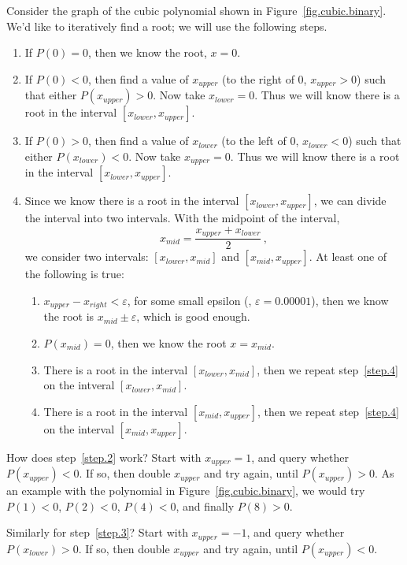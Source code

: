 Consider the graph of the cubic polynomial shown in Figure~\ref{fig.cubic.binary}.  We'd like to
iteratively find a root; we will use the following steps.

\begin{enumerate}
\item If $P(0)=0$, then we know the root, $x=0$.
\item \label{step.2} If $P(0)< 0$, then find a value of $x_{upper}$ (to the right of 0, $x_{upper}>0$) such that either $P(x_{upper})>0$.
  Now take $x_{lower}=0$.
  Thus we
  will know there is a root in the interval $[x_{lower}, x_{upper}]$.
\item \label{step.3} If $P(0)> 0$, then find a value of $x_{lower}$ (to the left of 0, $x_{lower}<0$) such that either $P(x_{lower})<0$. 
  Now take $x_{upper}=0$.
 Thus we
  will know there is a root in the interval $[x_{lower}, x_{upper}]$.
\item \label{step.4} Since we know there is a root in the interval
  $[x_{lower}, x_{upper}]$, we can divide the interval into two
  intervals.  With the midpoint of the interval, \[x_{mid} =
  \frac{x_{upper} + x_{lower}}{2}\,,\] we consider two intervals:
  $[x_{lower}, x_{mid}]$ and $[x_{mid}, x_{upper}]$.  At least one of
  the following is true:
  \begin{enumerate}
  \item $x_{upper} - x_{right} < \varepsilon$, for some small epsilon (\eg, $\varepsilon = 0.00001$),
    then we know the root is $x_{mid} \pm \varepsilon$, which is good enough.
  \item $P(x_{mid}) = 0$, then we know the root $x= x_{mid}$.
  \item There is a root in the interval $[x_{lower}, x_{mid}]$, then
    we repeat step~\ref{step.4} on the intveral $[x_{lower},
      x_{mid}]$.
  \item There is a root in the interval $[x_{mid}, x_{upper}]$, then
    we repeat step~\ref{step.4} on the interval $[x_{mid},
      x_{upper}]$.
  \end{enumerate}
\end{enumerate}


How does step~\ref{step.2} work?  Start with  $x_{upper}=1$, and query whether ${P(x_{upper}) < 0}$.
If so, then double $x_{upper}$ and try again, until ${P(x_{upper}) > 0}$.  As an example with the polynomial in Figure~\ref{fig.cubic.binary}, we would try ${P(1)< 0}$, ${P(2) < 0}$, ${P(4)<0}$, and finally ${P(8) > 0}$.

Similarly for step~\ref{step.3}?  Start with  $x_{upper}=-1$, and query whether ${P(x_{lower}) > 0}$.
If so, then double $x_{upper}$ and try again, until ${P(x_{upper}) < 0}$.

